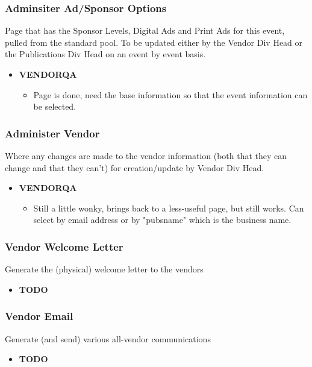 \documentclass[captions=tablesignature]{scrartcl}
\begin{document}
\subsubsection{Adminsiter Ad/Sponsor Options}
\label{sec-3-1-13}
Page that has the Sponsor Levels, Digital Ads and Print Ads for
this event, pulled from the standard pool.  To be updated either
by the Vendor Div Head or the Publications Div Head on an event by
event basis.
\begin{itemize}
\item {\bfseries\sffamily VENDORQA} 
\label{sec-3-1-13-1}
\begin{itemize}
\item Page is done, need the base information so that the event
information can be selected.
\end{itemize}
\end{itemize}

\subsubsection{Administer Vendor}
\label{sec-3-1-14}
Where any changes are made to the vendor information (both that
they can change and that they can't) for creation/update by Vendor
Div Head.
\begin{itemize}
\item {\bfseries\sffamily VENDORQA} 
\label{sec-3-1-14-1}
\begin{itemize}
\item Still a little wonky, brings back to a less-useful page, but
still works.  Can select by email address or by "pubsname"
which is the business name.
\end{itemize}
\end{itemize}

\subsubsection{Vendor Welcome Letter}
\label{sec-3-1-15}
Generate the (physical) welcome letter to the vendors
\begin{itemize}
\item {\bfseries\sffamily TODO} 
\label{sec-3-1-15-1}
\end{itemize}

\subsubsection{Vendor Email}
\label{sec-3-1-16}
Generate (and send) various all-vendor communications
\begin{itemize}
\item {\bfseries\sffamily TODO} 
\label{sec-3-1-16-1}
\end{itemize}
\end{document}
